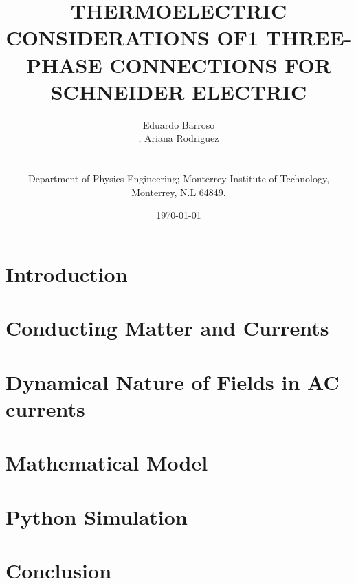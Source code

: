\documentclass{document_layout}
\title{THERMOELECTRIC CONSIDERATIONS OF1
THREE-PHASE CONNECTIONS FOR SCHNEIDER
ELECTRIC}
\author{
    Eduardo Barroso\address{1}, Ariana Rodriguez\address{1} \\[0.5em]
    {\scriptsize
        \address{1} Department of Physics Engineering; Monterrey Institute of Technology, Monterrey, N.L 64849.\\
    }
}
\date{\today}
\begin{document}
\maketitle
    
\section{Introduction}


\section{Conducting Matter and Currents}


\section{Dynamical Nature of Fields in AC currents}


\section{Mathematical Model}


\section{Python Simulation}


\section{Conclusion}


\onecolumn
\printbibliography
\twocolumn
\end{document}
